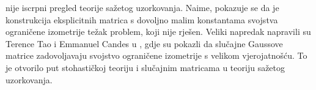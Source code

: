 \documentclass[a4paper,twoside,12pt]{memoir} %
\begin{document}
\begin{sazetak}
nije iscrpni pregled teorije sa\v{z}etog uzorkovanja. Naime, pokazuje se da je konstrukcija eksplicitnih matrica s dovoljno malim konstantama svojstva ograni\v{c}ene izometrije te\v{z}ak problem, koji nije rje\v{s}en. Veliki napredak napravili su Terence Tao i Emmanuel Candes u \cite{CandesTao}, gdje su pokazli da slu\v{c}ajne Gaussove matrice zadovoljavaju svojstvo ograni\v{c}ene izometrije s velikom vjerojatno\v{s}\'cu. To je otvorilo put stohasti\v{c}koj teoriju i slu\v{c}ajnim matricama u teoriju sa\v{z}etog uzorkovanja.
\end{sazetak}

\begin{summary}
\end{summary}


\begin{cv}
\end{cv}
\end{document}
